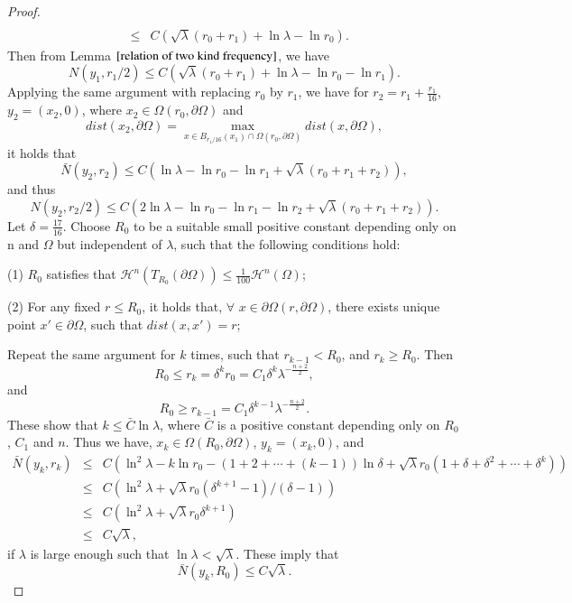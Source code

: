 \documentclass[a4paper, 12pt, onecolumn]{article} \textwidth 148mm
\begin{document}
\begin{proof}
\begin{eqnarray*}
\\&\leq&C(\sqrt{\lambda}(r_0+r_1)+\ln\lambda-\ln r_0).
\end{eqnarray*}
Then from Lemma $\ref{relation of two kind frequency}$, we have
\begin{equation*}
N(y_1,r_1/2)\leq C(\sqrt{\lambda}(r_0+r_1)+\ln\lambda-\ln r_0-\ln r_1).
\end{equation*}
Applying the same argument with replacing $r_0$ by $r_1$, we have for $r_2=r_1+\frac{r_1}{16}$, $y_2=(x_2,0)$, where $x_2\in\Omega(r_0,\partial\Omega)$ and $$dist(x_2,\partial\Omega)=\max_{x\in      B_{r_1/16}(x_1)\cap\Omega(r_0,\partial\Omega)}dist(x,\partial\Omega),$$
it holds that
\begin{equation*}
\bar{N}(y_2,r_2)\leq C(\ln\lambda-\ln r_0-\ln r_1+\sqrt{\lambda}(r_0+r_1+r_2)),
\end{equation*}
and thus
\begin{equation*}
N(y_2,r_2/2)\leq C(2\ln\lambda-\ln r_0-\ln r_1-\ln r_2+\sqrt{\lambda}(r_0+r_1+r_2)).
\end{equation*}
Let $\delta=\frac{17}{16}$.
 Choose $R_0$ to be a suitable small positive constant depending only on n and $\Omega$ but independent of $\lambda$, such that the following conditions hold:

(1) $R_0$ satisfies that $\mathcal{H}^n(T_{R_0}(\partial\Omega))\leq\frac{1}{100}\mathcal{H}^n(\Omega)$;

(2) For any fixed $r\leq R_0$, it holds that, $\forall$ $x\in\partial\Omega(r,\partial\Omega)$, there exists unique point $x'\in\partial\Omega$, such that $dist(x,x')=r$;

Repeat the same argument for $k$ times, such that $r_{k-1}<R_0$, and $r_k\geq R_0$.
Then
\begin{equation*}
R_0\leq r_k=\delta^kr_0=C_1\delta^k\lambda^{-\frac{n+2}{2}},
\end{equation*}
and
\begin{equation*}
R_0\geq r_{k-1}=C_1\delta^{k-1}\lambda^{-\frac{n+2}{2}}.
\end{equation*}
These show that $k\leq\bar{C}\ln\lambda$, where $\bar{C}$ is a positive constant depending only on $R_0$, $C_1$ and $n$. Thus we have, $x_k\in\Omega(R_0,\partial\Omega)$, $y_k=(x_k,0)$, and
\begin{eqnarray*}
\bar{N}(y_k,r_k)&\leq&C(\ln^2\lambda-k\ln r_0-(1+2+\cdots+(k-1))\ln\delta+\sqrt{\lambda}r_0(1+\delta+\delta^2+\cdots+\delta^{k}))
\\&\leq&C(\ln^2\lambda+\sqrt{\lambda}r_0(\delta^{k+1}-1)/(\delta-1))
\\&\leq&C(\ln^2\lambda+\sqrt{\lambda}r_0\delta^{k+1})
\\&\leq&C\sqrt{\lambda},
\end{eqnarray*}
if $\lambda$ is large enough such that $\ln\lambda<\sqrt{\lambda}$.
These imply that
\begin{equation}\label{upper bound for doubling index with radius R0}
\bar{N}(y_k,R_0)\leq C\sqrt{\lambda}.
\end{equation}


\end{proof}
\end{document}
